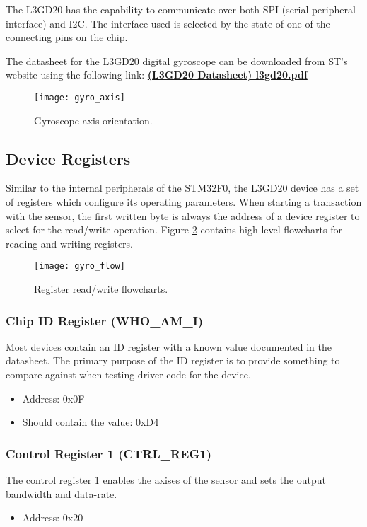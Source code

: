 \documentclass[openany,11pt,fleqn]{book} %
\begin{document}
The L3GD20 has the capability to communicate over both SPI (serial-peripheral-interface) and I2C. The interface used is selected by the state of one of the connecting pins on the chip. 

The datasheet for the L3GD20 digital gyroscope can be downloaded from ST's website using the following link: \href{http://www.st.com/resource/en/datasheet/l3gd20.pdf}{\textbf{(L3GD20 Datasheet) l3gd20.pdf}}

\begin{figure}[]
    \centering\texttt{[image: gyro\_axis]}
    \caption{Gyroscope axis orientation.}
    \label{gyro_axis}
\end{figure}

\subsection{Device Registers}
Similar to the internal peripherals of the STM32F0, the L3GD20 device has a set of registers which configure its operating parameters. When starting a transaction with the sensor, the first written byte is always the address of a device register to select for the read/write operation. Figure \ref{gyro_flow} contains high-level flowcharts for reading and writing registers. 

\begin{figure}[]
    \centering\texttt{[image: gyro\_flow]}
    \caption{Register read/write flowcharts.}
    \label{gyro_flow}
\end{figure}


\subsubsection{Chip ID Register (WHO\_AM\_I)}
Most devices contain an ID register with a known value documented in the datasheet. The primary purpose of the ID register is to provide something to compare against when testing driver code for the device. 
\begin{itemize}
    \item Address: 0x0F
    \item Should contain the value: 0xD4
\end{itemize}

\subsubsection{Control Register 1 (CTRL\_REG1)}
The control register 1 enables the axises of the sensor and sets the output bandwidth and data-rate. 
\begin{itemize}
    \item Address: 0x20
\end{itemize}
\end{document}
